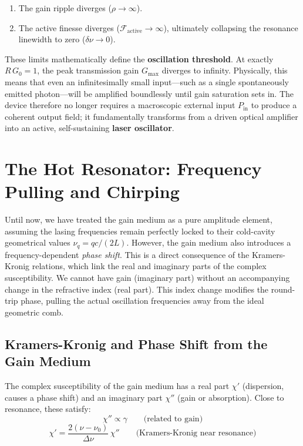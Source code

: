 \begin{enumerate}
    \item The gain ripple diverges ($\rho \to \infty$).
    \item The active finesse diverges ($\mathcal{F}_{\text{active}} \to \infty$), ultimately collapsing the resonance linewidth to zero ($\delta\nu \to 0$).
\end{enumerate}

These limits mathematically define the \textbf{oscillation threshold}. At exactly $R\,G_0 = 1$, the peak transmission gain $G_{\max}$ diverges to infinity. Physically, this means that even an infinitesimally small input---such as a single spontaneously emitted photon---will be amplified boundlessly until gain saturation sets in. The device therefore no longer requires a macroscopic external input $P_{\text{in}}$ to produce a coherent output field; it fundamentally transforms from a driven optical amplifier into an active, self-sustaining \textbf{laser oscillator}.

\section{The Hot Resonator: Frequency Pulling and Chirping}

Until now, we have treated the gain medium as a pure amplitude element, assuming the lasing frequencies remain perfectly locked to their cold-cavity geometrical values $\nu_q = qc/(2L)$. However, the gain medium also introduces a frequency-dependent \emph{phase shift}. This is a direct consequence of the Kramers-Kronig relations, which link the real and imaginary parts of the complex susceptibility. We cannot have gain (imaginary part) without an accompanying change in the refractive index (real part). This index change modifies the round-trip phase, pulling the actual oscillation frequencies away from the ideal geometric comb.

\subsection{Kramers-Kronig and Phase Shift from the Gain Medium}

The complex susceptibility of the gain medium has a real part $\chi'$ (dispersion, causes a phase shift) and an imaginary part $\chi''$ (gain or absorption). Close to resonance, these satisfy:
\begin{equation*}
    \chi'' \propto \gamma \qquad\text{(related to gain)}
\end{equation*}
\begin{equation*}
    \chi' = \frac{2(\nu - \nu_0)}{\Delta\nu}\,\chi'' \qquad\text{(Kramers-Kronig near resonance)}
\end{equation*}

